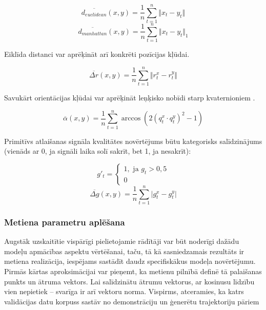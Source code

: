 \documentclass[12pt, a4paper]{article}
\numberwithin{equation}{section} %
\begin{document}
\begin{equation}
    \overline{d_{euclidean}}(x,y) = \frac{1}{n} \sum_{t=1}^{n} \Vert x_t - y_t \Vert
\end{equation}
\begin{equation}
    \overline{d_{manhattan}}(x,y) = \frac{1}{n} \sum_{t=1}^{n} \Vert x_t - y_t \Vert_1
\end{equation}

Eiklīda distanci var aprēķināt arī konkrēti pozīcijas kļūdai.

\begin{equation}
    \overline{\Delta r}(x,y) = \frac{1}{n} \sum_{t=1}^{n} \Vert r^x_t - r^y_t \Vert
\end{equation}

Savukārt orientācijas kļūdai var aprēķināt leņķisko nobīdi starp kvaternioniem \cite{quat_distance}.

\begin{equation}
    \overline{\alpha}(x,y) = \frac{1}{n} \sum_{t=1}^{n} \arccos \left (2(q^x_t \cdot q^y_t)^2 - 1 \right )
\end{equation}

Primitīvs atlaišanas signāla kvalitātes novērtējums būtu kategorisks salīdzinājums (vienāds ar 0, ja signāli laika solī sakrīt, bet 1, ja nesakrīt):

\begin{equation}
    g'_t = 
    \begin{cases}
        1, \text{ ja } g_t > 0,5 \\
        0
    \end{cases}
\end{equation}
\begin{equation}
    \overline{\Delta g}(x,y) = \frac{1}{n} \sum_{t=1}^{n} \vert g^x_t - g^y_t \vert
\end{equation}

\subsubsection{Metiena parametru aplēšana}

Augstāk uzskaitītie vispārīgi pielietojamie rādītāji var būt noderīgi dažādu modeļu apmācības aspektu vērtēšanai, taču, tā kā sasniedzamais rezultāts ir metiena realizācija, iespējams sastādīt daudz specifiskākus modeļa novērtējumu. Pirmās kārtas aproksimācijai var pieņemt, ka metienu pilnībā definē tā palaišanas punkts un ātruma vektors. Lai salīdzinātu ātrumu vektorus, ar kosinusu līdzību vien nepietiek -- svarīga ir arī vektoru norma. Vispirms, atceramies, ka katrs validācijas datu korpuss sastāv no demonstrāciju un ģenerētu trajektoriju pāriem
\end{document}
